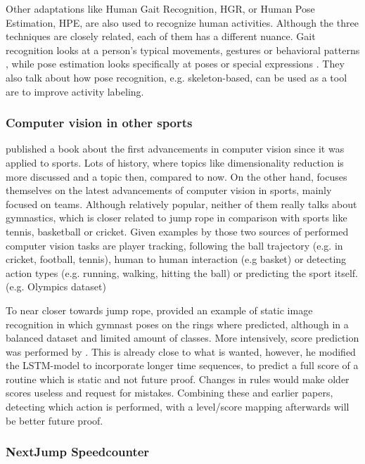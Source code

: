 Other adaptations like Human Gait Recognition, HGR, or Human Pose Estimation, HPE, are also used to recognize human activities. Although the three techniques are closely related, each of them has a different nuance. Gait recognition looks at a person's typical movements, gestures or behavioral patterns \autocite{Alharthi_2019}, while pose estimation looks specifically at poses or special expressions \autocite{Song_2021}. They also talk about how pose recognition, e.g. skeleton-based, can be used as a tool are to improve activity labeling.

\subsubsection{Computer vision in other sports}
\label{subsubsec:literature-computer-vision-sports}

\textcite{Soomro_2014} published a book about the first advancements in computer vision since it was applied to sports. Lots of history, where topics like dimensionality reduction is more discussed and a topic then, compared to now. On the other hand, \textcite{Yin_2024} focuses themselves on the latest advancements of computer vision in sports, mainly focused on teams. Although relatively popular, neither of them really talks about gymnastics, which is closer related to jump rope in comparison with sports like tennis, basketball or cricket.
Given examples by those two sources of performed computer vision tasks are player tracking, following the ball trajectory (e.g. in cricket, football, tennis), human to human interaction (e.g basket) or detecting action types (e.g. running, walking, hitting the ball) or predicting the sport itself. (e.g. Olympics dataset)

To near closer towards jump rope, \textcite{Abdullah_2023} provided an example of static image recognition in which gymnast poses on the rings where predicted, although in a balanced dataset and limited amount of classes. More intensively, score prediction was performed by \textcite{Zahan_2023}. This is already close to what is wanted, however, he modified the LSTM-model to incorporate longer time sequences, to predict a full score of a routine which is static and not future proof. Changes in rules would make older scores useless and request for mistakes.
Combining these and earlier papers, detecting which action is performed, with a level/score mapping afterwards will be better future proof.

\subsubsection{NextJump Speedcounter}
\label{subsubsec:literature-nextjump-speedcounter}


